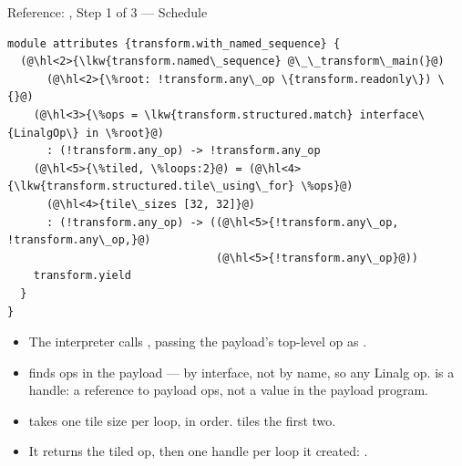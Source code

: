\documentclass[aspectratio=169,10pt]{beamer}
\begin{document}
\begin{frame}[fragile]{Reference: , Step 1 of 3 --- Schedule}
\begin{lstlisting}[language=mlir]
module attributes {transform.with_named_sequence} {
  (@\hl<2>{\lkw{transform.named\_sequence} @\_\_transform\_main(}@)
      (@\hl<2>{\%root: !transform.any\_op \{transform.readonly\}) \{}@)
    (@\hl<3>{\%ops = \lkw{transform.structured.match} interface\{LinalgOp\} in \%root}@)
      : (!transform.any_op) -> !transform.any_op
    (@\hl<5>{\%tiled, \%loops:2}@) = (@\hl<4>{\lkw{transform.structured.tile\_using\_for} \%ops}@)
      (@\hl<4>{tile\_sizes [32, 32]}@)
      : (!transform.any_op) -> ((@\hl<5>{!transform.any\_op, !transform.any\_op,}@)
                                (@\hl<5>{!transform.any\_op}@))
    transform.yield
  }
}
\end{lstlisting}
  \vspace{0.3em}
  \begin{itemize}
    \item<2-> The interpreter calls , passing the
      payload's top-level op as .
    \item<3->  finds ops in the payload --- by \alert{interface},
      not by name, so any Linalg op.  is a \alert{handle}: a
      reference to payload ops, not a value in the payload program.
    \item<4->  takes one tile size per loop, in
       order. \cd{[32, 32]} tiles the first two.
    \item<5-> It returns the tiled op, then one handle per loop it created:
      .
  \end{itemize}
\end{frame}
\end{document}
